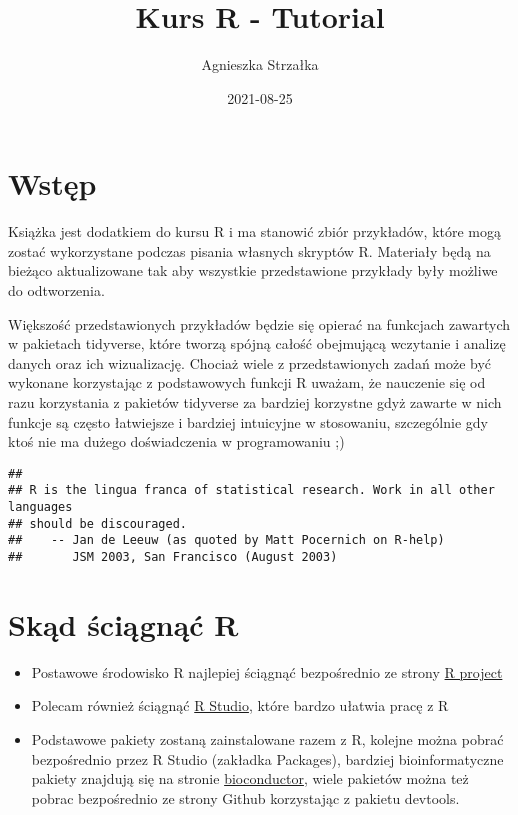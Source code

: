 \documentclass[
]{book}
\title{Kurs R - Tutorial}
\author{Agnieszka Strzałka}
\date{2021-08-25}
\providecommand{\tightlist}{%
  \setlength{\itemsep}{0pt}\setlength{\parskip}{0pt}}
\begin{document}
\maketitle

{
\setcounter{tocdepth}{1}
\tableofcontents
}
\hypertarget{wstux119p}{%
\chapter{Wstęp}\label{wstux119p}}

Książka jest dodatkiem do kursu R i ma stanowić zbiór przykładów, które mogą zostać wykorzystane podczas pisania własnych skryptów R. Materiały będą na bieżąco aktualizowane tak aby wszystkie przedstawione przykłady były możliwe do odtworzenia.

Większość przedstawionych przykładów będzie się opierać na funkcjach zawartych w pakietach tidyverse, które tworzą spójną całość obejmującą wczytanie i analizę danych oraz ich wizualizację. Chociaż wiele z przedstawionych zadań może być wykonane korzystając z podstawowych funkcji R uważam, że nauczenie się od razu korzystania z pakietów tidyverse za bardziej korzystne gdyż zawarte w nich funkcje są często łatwiejsze i bardziej intuicyjne w stosowaniu, szczególnie gdy ktoś nie ma dużego doświadczenia w programowaniu ;)

\begin{verbatim}
## 
## R is the lingua franca of statistical research. Work in all other languages
## should be discouraged.
##    -- Jan de Leeuw (as quoted by Matt Pocernich on R-help)
##       JSM 2003, San Francisco (August 2003)
\end{verbatim}

\hypertarget{skux105d-ux15bciux105gnux105ux107-r}{%
\chapter{Skąd ściągnąć R}\label{skux105d-ux15bciux105gnux105ux107-r}}

\begin{itemize}
\tightlist
\item
  Postawowe środowisko R najlepiej ściągnąć bezpośrednio ze strony \href{http://www.r-project.org/}{R project}
\item
  Polecam również ściągnąć \href{http://www.rstudio.com/}{R Studio}, które bardzo ułatwia pracę z R
\item
  Podstawowe pakiety zostaną zainstalowane razem z R, kolejne można pobrać bezpośrednio przez R Studio (zakładka Packages), bardziej bioinformatyczne pakiety znajdują się na stronie \href{http://www.bioconductor.org/}{bioconductor},
  wiele pakietów można też pobrac bezpośrednio ze strony Github korzystając z pakietu devtools.
\end{itemize}
\end{document}
